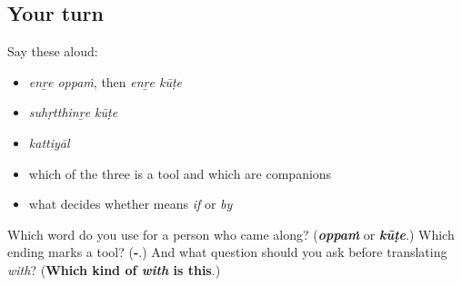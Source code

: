 \subsection*{Your turn}
Say these aloud:

\begin{itemize}
\raggedright
  \item \emph{enṟe oppaṁ}, then \emph{enṟe kūṭe}
  \item \emph{suhṛtthinṟe kūṭe}
  \item \emph{kattiyāl}
  \item which of the three is a tool and which are companions
  \item what decides whether \textbf{} means \emph{if} or \emph{by}
\end{itemize}

\begin{tcolorbox}[breakable,colback=teal!4,colframe=teal!35!black,title={Before you move on}]
Which word do you use for a person who came along? (\emph{\textbf{oppaṁ}} or \emph{\textbf{kūṭe}}.) Which ending marks a tool? (\textbf{-}.) And what question should you ask before translating \emph{with}? (\textbf{Which kind of \emph{with} is this}.)
\end{tcolorbox}
